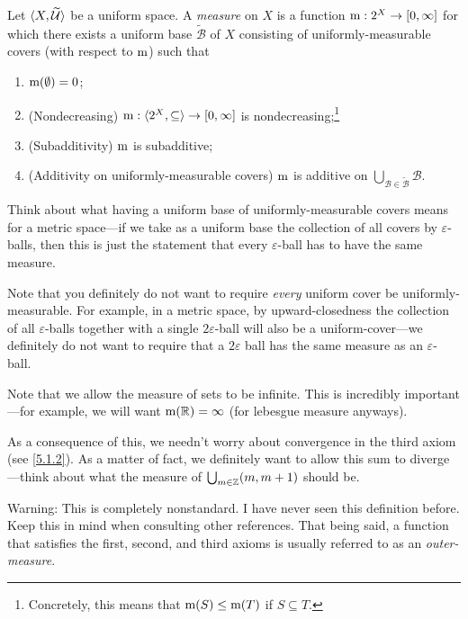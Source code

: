 \begin{dfn}[Measure]\label{Measure}
Let $\langle X,\widetilde{\mathcal{U}}\rangle$ be a uniform space.  A \emph{measure} on $X$ is a function $\mathrm{m} :2^X\rightarrow [0,\infty ]$ for which there exists a uniform base $\widetilde{\mathcal{B}}$ of $X$ consisting of uniformly-measurable covers (with respect to $\mathrm{m}$) such that
\begin{enumerate}
\item \label{Measure.i}$\mathrm{m} (\emptyset )=0$;
\item (Nondecreasing)\label{Measure.Monotonicity} $\mathrm{m} :\langle2^X,\subseteq\rangle\rightarrow [0,\infty ]$ is nondecreasing;\footnote{Concretely, this means that $\mathrm{m} (S)\leq \mathrm{m} (T)$ if $S\subseteq T$.}
\item (Subadditivity) $\mathrm{m}$ is subadditive;
\item (Additivity on uniformly-measurable covers) $\mathrm{m}$ is additive on $\bigcup _{\mathcal{B}\in \widetilde{\mathcal{B}}}\mathcal{B}$.
\end{enumerate}
\begin{rmk}
Think about what having a uniform base of uniformly-measurable covers means for a metric space---if we take as a uniform base the collection of all covers by $\varepsilon$-balls, then this is just the statement that every $\varepsilon$-ball has to have the same measure.
\end{rmk}
\begin{rmk}
Note that you definitely do not want to require \emph{every} uniform cover be uniformly-measurable.  For example, in a metric space, by upward-closedness the collection of all $\varepsilon$-balls together with a single $2\varepsilon$-ball will also be a uniform-cover---we definitely do not want to require that a $2\varepsilon$ ball has the same measure as an $\varepsilon$-ball.
\end{rmk}
\begin{rmk}
Note that we allow the measure of sets to be infinite.  This is incredibly important---for example, we will want $\mathrm{m} (\mathbb{R} )=\infty$ (for lebesgue measure anyways).
\end{rmk}
\begin{rmk}
As a consequence of this, we needn't worry about convergence in the third axiom (see \eqref{5.1.2}).  As a matter of fact, we definitely want to allow this sum to diverge---think about what the measure of $\bigcup _{m\in \mathbb{Z}}(m,m+1)$ should be.
\end{rmk}
\begin{rmk}
Warning:  This is completely nonstandard.  I have never seen this definition before.  Keep this in mind when consulting other references.  That being said, a function that satisfies the first, second, and third axioms is usually referred to as an \emph{outer-measure}.
\end{rmk}
\end{dfn}
